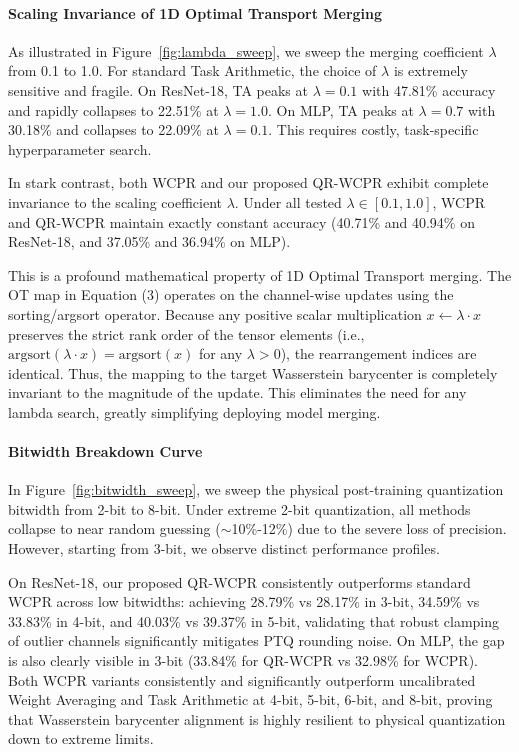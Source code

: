 \documentclass{article}
\theoremstyle{plain}
\theoremstyle{definition}
\theoremstyle{remark}
\begin{document}
\paragraph{Scaling Invariance of 1D Optimal Transport Merging}
As illustrated in Figure~\ref{fig:lambda_sweep}, we sweep the merging coefficient $\lambda$ from 0.1 to 1.0. For standard Task Arithmetic, the choice of $\lambda$ is extremely sensitive and fragile. On ResNet-18, TA peaks at $\lambda=0.1$ with 47.81\% accuracy and rapidly collapses to 22.51\% at $\lambda=1.0$. On MLP, TA peaks at $\lambda=0.7$ with 30.18\% and collapses to 22.09\% at $\lambda=0.1$. This requires costly, task-specific hyperparameter search.

In stark contrast, both WCPR and our proposed QR-WCPR exhibit complete invariance to the scaling coefficient $\lambda$. Under all tested $\lambda \in [0.1, 1.0]$, WCPR and QR-WCPR maintain exactly constant accuracy (40.71\% and 40.94\% on ResNet-18, and 37.05\% and 36.94\% on MLP). 

This is a profound mathematical property of 1D Optimal Transport merging. The OT map in Equation (3) operates on the channel-wise updates using the sorting/argsort operator. Because any positive scalar multiplication $x \leftarrow \lambda \cdot x$ preserves the strict rank order of the tensor elements (i.e., $\text{argsort}(\lambda \cdot x) = \text{argsort}(x)$ for any $\lambda > 0$), the rearrangement indices are identical. Thus, the mapping to the target Wasserstein barycenter is completely invariant to the magnitude of the update. This eliminates the need for any lambda search, greatly simplifying deploying model merging.

\paragraph{Bitwidth Breakdown Curve}
In Figure~\ref{fig:bitwidth_sweep}, we sweep the physical post-training quantization bitwidth from 2-bit to 8-bit. Under extreme 2-bit quantization, all methods collapse to near random guessing ($\sim$10\%-12\%) due to the severe loss of precision. However, starting from 3-bit, we observe distinct performance profiles.

On ResNet-18, our proposed QR-WCPR consistently outperforms standard WCPR across low bitwidths: achieving 28.79\% vs 28.17\% in 3-bit, 34.59\% vs 33.83\% in 4-bit, and 40.03\% vs 39.37\% in 5-bit, validating that robust clamping of outlier channels significantly mitigates PTQ rounding noise. On MLP, the gap is also clearly visible in 3-bit (33.84\% for QR-WCPR vs 32.98\% for WCPR). Both WCPR variants consistently and significantly outperform uncalibrated Weight Averaging and Task Arithmetic at 4-bit, 5-bit, 6-bit, and 8-bit, proving that Wasserstein barycenter alignment is highly resilient to physical quantization down to extreme limits.
\end{document}
